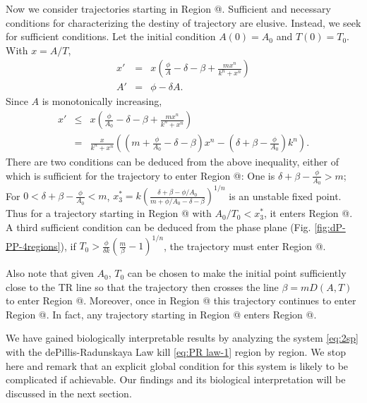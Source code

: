 \documentclass[review,authoryear]{elsarticle}
\makeatletter
\newcommand*{\rom}[1]{\expandafter\@slowromancap\romannumeral #1@}
\makeatother
\begin{document}
Now we consider trajectories starting in Region \rom{3}.  Sufficient and necessary
conditions for characterizing the destiny of trajectory are elusive.
Instead, we seek for sufficient conditions. Let the initial condition $A(0)=A_0$ and $T(0)=T_0$.
With $x=A/T$, 
\begin{eqnarray*}
x' & = & x(\frac{\phi}{A}-\delta-\beta+\frac{mx^{n}}{k^{n}+x^{n}})\\
A' & = & \phi-\delta A.
\end{eqnarray*}
Since $A$ is monotonically increasing,
\begin{eqnarray*}
x' & \le & x(\frac{\phi}{A_{0}}-\delta-\beta+\frac{mx^{n}}{k^{n}+x^{n}})\\
   & = & \frac{x}{k^{n}+x^{n}}((m+\frac{\phi}{A_{0}}-\delta-\beta)x^{n}-(\delta+\beta-\frac{\phi}{A_{0}})k^{n}).
\end{eqnarray*}
There are two conditions can be deduced from the above inequality, either of which is sufficient for the trajectory
to enter Region \rom{2}: One is $\delta+\beta-\frac{\phi}{A_{0}}>m$; For $0<\delta+\beta-\frac{\phi}{A_{0}}<m$,
$x_{3}^{*}=k(\frac{\delta+\beta-\phi/A_{0}}{m+\phi/A_{0}-\delta-\beta})^{1/n}$ is an unstable fixed point. Thus for a trajectory starting in Region \rom{3} with $A_0/T_0<x_{3}^{*}$,
it enters Region \rom{2}. A third sufficient condition can be deduced from the phase plane (Fig. \ref{fig:dP-PP-4regions}), if $T_0>\frac{\phi}{\delta k}(\frac{m}{\beta}-1)^{1/n}$, the trajectory must enter Region \rom{2}. 

Also note that given $A_0$, $T_0$ can be chosen to make the initial point sufficiently close to the TR line so that the trajectory then crosses the line $\beta=mD(A,T)$
to enter Region \rom{4}. Moreover, once in Region \rom{4} this trajectory continues to enter Region \rom{1}. In fact, any trajectory starting in Region \rom{4} enters Region \rom{1}. 

We have gained biologically interpretable results by analyzing the system \ref{eq:2sp} with the dePillis-Radunskaya Law kill \ref{eq:PR law-1} region by region. We stop here and remark that an explicit global condition for this system is likely to be complicated if achievable.  Our findings and its biological interpretation will be discussed in the next section.
\end{document}
